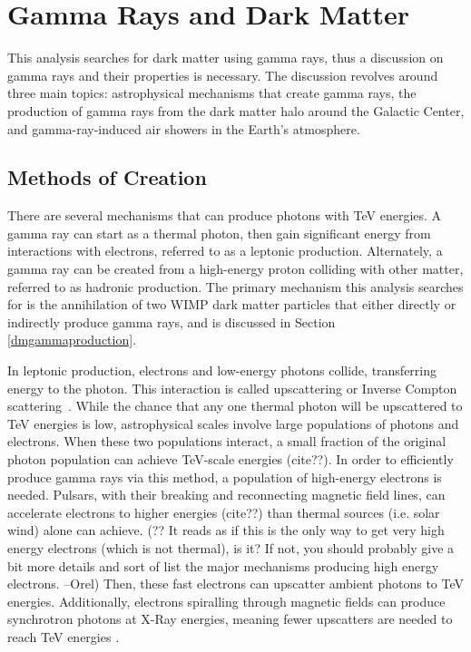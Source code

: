 \cleartooddpage[\thispagestyle{empty}]
\chapter{Gamma Rays and Dark Matter}

This analysis searches for dark matter using gamma rays, thus a discussion on gamma rays and their properties is necessary.
The discussion revolves around three main topics: astrophysical mechanisms that create gamma rays, the production of gamma rays from the dark matter halo around the Galactic Center, and gamma-ray-induced air showers in the Earth's atmosphere.

\section{Methods of Creation}

  There are several mechanisms that can produce photons with TeV energies.
  A gamma ray can start as a thermal photon, then gain significant energy from interactions with electrons, referred to as a leptonic production.
  Alternately, a gamma ray can be created from a high-energy proton colliding with other matter, referred to as hadronic production.
  The primary mechanism this analysis searches for is the annihilation of two WIMP dark matter particles that either directly or indirectly produce gamma rays, and is discussed in Section \ref{dmgammaproduction}.

  In leptonic production, electrons and low-energy photons collide, transferring energy to the photon.
  This interaction is called upscattering or Inverse Compton scattering~\cite{compton_effect}.
  While the chance that any one thermal photon will be upscattered to TeV energies is low, astrophysical scales involve large populations of photons and electrons.
  When these two populations interact, a small fraction of the original photon population {\color{red}can achieve TeV-scale energies (cite??)}.
  In order to efficiently produce gamma rays via this method, a population of high-energy electrons is needed.
  Pulsars, with their breaking and reconnecting magnetic field lines, {\color{red}can accelerate electrons to higher energies (cite??)} than thermal sources (i.e. solar wind) alone can achieve.
  {\color{red}(?? It reads as if this is the only way to get very high energy electrons (which is not thermal), is it? If not, you should probably give a bit more details and sort of list the major mechanisms producing high energy electrons. --Orel)}
  Then, these fast electrons can upscatter ambient photons to TeV energies.
  Additionally, electrons spiralling through magnetic fields can produce synchrotron photons at X-Ray energies, meaning fewer upscatters are needed to reach TeV energies \cite{self_compton}.

